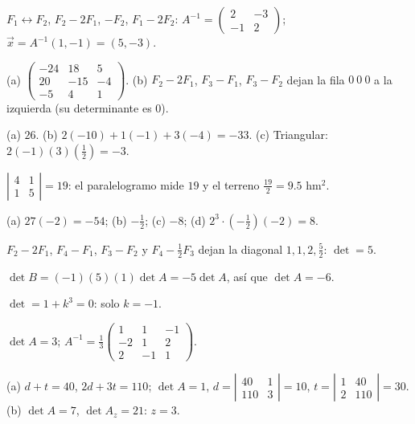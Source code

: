 \documentclass[11pt,a4paper]{article}
\newcommand{\sm}[1]{\left(\begin{smallmatrix}#1\end{smallmatrix}\right)}
\newcommand{\sv}[1]{\left|\begin{smallmatrix}#1\end{smallmatrix}\right|}
\begin{document}
\respuestas
\begin{respuestascortas}
\begin{soluciones}
\item $F_1\leftrightarrow F_2$, $F_2-2F_1$, $-F_2$, $F_1-2F_2$: $A^{-1}=\sm{2&-3\\-1&2}$; $\vec x=A^{-1}(1,-1)=(5,-3)$.
\item (a) $\sm{-24&18&5\\20&-15&-4\\-5&4&1}$. (b) $F_2-2F_1$, $F_3-F_1$, $F_3-F_2$ dejan la fila $0\ 0\ 0$ a la izquierda (su determinante es $0$).
\item (a) $26$. (b) $2(-10)+1(-1)+3(-4)=-33$. (c) Triangular: $2(-1)(3)\left(\tfrac12\right)=-3$.
\item $\sv{4&1\\1&5}=19$: el paralelogramo mide $19$ y el terreno $\tfrac{19}{2}=9.5$ hm$^2$.
\item (a) $27(-2)=-54$; (b) $-\tfrac12$; (c) $-8$; (d) $2^3\cdot\left(-\tfrac12\right)(-2)=8$.
\item $F_2-2F_1$, $F_4-F_1$, $F_3-F_2$ y $F_4-\tfrac12F_3$ dejan la diagonal $1,1,2,\tfrac52$: $\det=5$.
\item $\det B=(-1)(5)(1)\det A=-5\det A$, así que $\det A=-6$.
\item $\det=1+k^3=0$: solo $k=-1$.
\item $\det A=3$; $A^{-1}=\tfrac13\sm{1&1&-1\\-2&1&2\\2&-1&1}$.
\item (a) $d+t=40$, $2d+3t=110$; $\det A=1$, $d=\sv{40&1\\110&3}=10$, $t=\sv{1&40\\2&110}=30$.
  (b) $\det A=7$, $\det A_z=21$: $z=3$.
\end{soluciones}
\end{respuestascortas}
\end{document}
